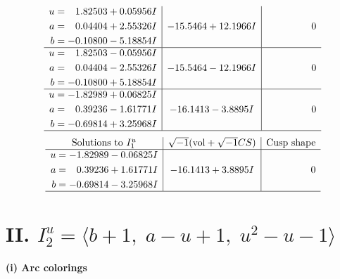 \documentclass[1p]{elsarticle_modified}
\theoremstyle{definition}
\newcommand{\I}{\sqrt{-1}}
\begin{document}
$$\begin{array}{c|c|c}
\begin{aligned}
u &= \phantom{-}1.82503 + 0.05956 I \\
a &= \phantom{-}0.04404 + 2.55326 I \\
b &= -0.10800 - 5.18854 I\end{aligned}
 & -15.5464 + 12.1966 I & \phantom{-0.000000 } 0 \\ \hline\begin{aligned}
u &= \phantom{-}1.82503 - 0.05956 I \\
a &= \phantom{-}0.04404 - 2.55326 I \\
b &= -0.10800 + 5.18854 I\end{aligned}
 & -15.5464 - 12.1966 I & \phantom{-0.000000 } 0 \\ \hline\begin{aligned}
u &= -1.82989 + 0.06825 I \\
a &= \phantom{-}0.39236 - 1.61771 I \\
b &= -0.69814 + 3.25968 I\end{aligned}
 & -16.1413 - 3.8895 I & \phantom{-0.000000 } 0\\
 \hline 
 \end{array}$$\newpage$$\begin{array}{c|c|c}  
\text{Solutions to }I^u_{1}& \I (\text{vol} + \sqrt{-1}CS) & \text{Cusp shape}\\
 \hline 
\begin{aligned}
u &= -1.82989 - 0.06825 I \\
a &= \phantom{-}0.39236 + 1.61771 I \\
b &= -0.69814 - 3.25968 I\end{aligned}
 & -16.1413 + 3.8895 I & \phantom{-0.000000 } 0\\
 \hline 
 \end{array}$$\newpage\newpage\renewcommand{\arraystretch}{1}
\centering \section*{II. $I^u_{2}= \langle b+1,\;a- u+1,\;u^2- u-1 \rangle$}
\flushleft \textbf{(i) Arc colorings}\\
\end{document}
